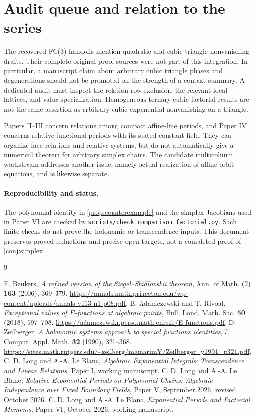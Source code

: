 \documentclass[11pt]{article}
\numberwithin{equation}{section}
\theoremstyle{definition}
\theoremstyle{remark}
\begin{document}
\section{Audit queue and relation to the series}
The recovered FC(3) handoffs mention quadratic and cubic triangle
nonvanishing drafts. Their complete original proof sources were not part
of this integration. In particular, a manuscript claim about arbitrary
cubic triangle phases and degenerations should not be promoted on the
strength of a context summary. A dedicated audit must inspect the
relation-row exclusion, the relevant local lattices, and value
specialization. Homogeneous ternary-cubic factorial results are not the
same assertion as arbitrary cubic exponential nonvanishing on a triangle.

Papers II--III concern relations among compact affine-line periods, and
Paper IV concerns relative functional periods with its stated constant
field. They can organize face relations and relative systems, but do not
automatically give a numerical theorem for arbitrary simplex chains.
The candidate multicolumn workstream addresses another issue, namely
actual realization of affine orbit equations, and is likewise separate.

\paragraph{Reproducibility and status.}
The polynomial identity in \cref{prop:counterexample} and the simplex
Jacobians used in Paper VI are checked by
\texttt{scripts/check\_comparison\_factorial.py}. Such finite checks do not
prove the holonomic or transcendence inputs. This document preserves
proved reductions and precise open targets, not a completed proof of
\cref{conj:simplex}.

\begin{thebibliography}{9}
\raggedright
{} F. Beukers, \emph{A refined version of the
Siegel--Shidlovskii theorem}, Ann. of Math. (2) \textbf{163} (2006), 369--379.
\url{https://annals.math.princeton.edu/wp-content/uploads/annals-v163-n1-p08.pdf}.
 B. Adamczewski and T. Rivoal, \emph{Exceptional values of
$E$-functions at algebraic points}, Bull. Lond. Math. Soc. \textbf{50}
(2018), 697--708. \url{https://adamczewski.perso.math.cnrs.fr/E-functions.pdf}.
 D. Zeilberger, \emph{A holonomic systems approach to
special functions identities}, J. Comput. Appl. Math. \textbf{32} (1990),
321--368.
\url{https://sites.math.rutgers.edu/~zeilberg/mamarimY/Zeilberger_y1991_p321.pdf}.
 C. D. Long and A.-A. Le Blanc, \emph{Algebraic Exponential
Integrals: Transcendence and Linear Relations}, Paper I, working manuscript.
 C. D. Long and A.-A. Le Blanc, \emph{Relative Exponential
Periods on Polynomial Chains: Algebraic Independence over Fixed Boundary
Fields}, Paper V, September 2026, revised October 2026.
 C. D. Long and A.-A. Le Blanc, \emph{Exponential Periods
and Factorial Moments}, Paper VI, October 2026, working manuscript.
\end{thebibliography}
\end{document}

